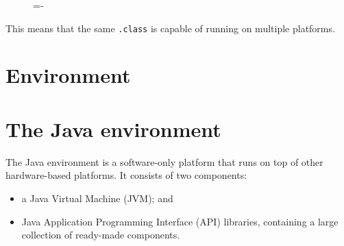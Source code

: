 \documentclass[a4paper]{systems-software}
\begin{document}
\begin{figure}[H]
  \lineskip=-\fboxrule
\end{figure}

This means that the same \texttt{.class} is capable of running on multiple platforms.


\newpage

\section{Environment}

\section*{The Java environment}

The Java environment is a software-only platform that runs on top of other hardware-based platforms. It consists of two components:
\begin{itemize}
	\item a Java Virtual Machine (JVM); and
	\item Java Application Programming Interface (API) libraries, containing a large collection of ready-made components.
\end{itemize}
\end{document}
